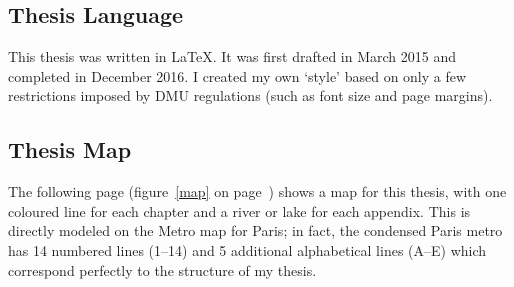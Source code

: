 \subsection{Thesis Language}

This thesis was written in \LaTeX. It was first drafted in March 2015 and completed in December 2016. I created my own `style' based on only a few restrictions imposed by \ac{DMU} regulations (such as font size and page margins).


\subsection{Thesis Map}

The following page (figure~\ref{map} on page~\pageref{map}) shows a map for this thesis, with one coloured line for each chapter and a river or lake for each appendix. This is directly modeled on the Metro map for Paris; in fact, the condensed Paris metro \autocite{ParisMetro} has 14 numbered lines (1--14) and 5 additional alphabetical lines (A--E) which correspond perfectly to the structure of my thesis.

